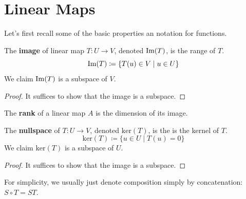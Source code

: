 \section{Linear Maps}

  Let's first recall some of the basic properties an notation for functions. 

  \begin{definition}[Image]
    The \textbf{image} of linear map $T: U \to V$, denoted $\operatorname{Im}(T)$, is the range of $T$. 
    \begin{equation}
      \operatorname{Im}(T) \coloneqq \{T(u) \in V \mid u \in U\}
    \end{equation}
    We claim $\operatorname{Im}(T)$ is a subspace of $V$. 
  \end{definition}
  \begin{proof}
    It suffices to show that the image is a subspace. 
  \end{proof}

  \begin{definition}[Rank]
    The \textbf{rank} of a linear map $A$ is the dimension of its image. 
  \end{definition}

  \begin{definition}[Nullspace]
    The \textbf{nullspace} of $T: U \to V$, denoted $\mathrm{ker}(T)$, is the 
    is the kernel of $T$. 
    \begin{equation}
      \mathrm{ker}(T) \coloneqq \{ u \in U \mid T(u) = 0\}
    \end{equation}
    We claim $\mathrm{ker}(T)$ is a subspace of $U$. 
  \end{definition}
  \begin{proof}
    It suffices to show that the image is a subspace. 
  \end{proof}

  For simplicity, we usually just denote composition simply by concatenation: $S \circ T = ST$. 

